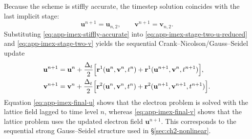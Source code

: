 Because the scheme is stiffly accurate, the timestep solution coincides with the last implicit stage:
\begin{equation}
    \mathbf{u}^{n+1} = \mathbf{u}_{n,2},
    \qquad
    \mathbf{v}^{n+1} = \mathbf{v}_{n,2}.
    \label{eq:app-imex-stiffly-accurate}
\end{equation}
Substituting \eqref{eq:app-imex-stiffly-accurate} into \eqref{eq:app-imex-stage-two-u-reduced} and \eqref{eq:app-imex-stage-two-v} yields the sequential Crank--Nicolson/Gauss--Seidel update
\begin{align}
    \mathbf{u}^{n+1}
     & =
    \mathbf{u}^{n}
    +
    \frac{\Delta_t}{2}
    \Bigl[
        \mathbf{r}^{1}(\mathbf{u}^{n},\mathbf{v}^{n},t^{n})
        +
        \mathbf{r}^{1}(\mathbf{u}^{n+1},\mathbf{v}^{n},t^{n+1})
        \Bigr],
    \label{eq:app-imex-final-u} \\
    \mathbf{v}^{n+1}
     & =
    \mathbf{v}^{n}
    +
    \frac{\Delta_t}{2}
    \Bigl[
        \mathbf{r}^{2}(\mathbf{u}^{n},\mathbf{v}^{n},t^{n})
        +
        \mathbf{r}^{2}(\mathbf{u}^{n+1},\mathbf{v}^{n+1},t^{n+1})
        \Bigr].
    \label{eq:app-imex-final-v}
\end{align}
Equation \eqref{eq:app-imex-final-u} shows that the electron problem is solved with the lattice field lagged to time level \(n\), whereas \eqref{eq:app-imex-final-v} shows that the lattice problem uses the updated electron field \(\mathbf{u}^{n+1}\).
This corresponds to the sequential strong Gauss--Seidel structure used in \S\ref{sec:ch2-nonlinear}.
